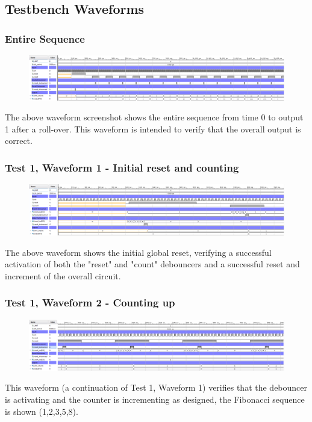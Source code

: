 \documentclass[11pt]{report}
\begin{document}
\subsection*{Testbench Waveforms}

\subsubsection*{Entire Sequence}
\begin{figure}[H]
    \includegraphics[width=\columnwidth]{Reports/Lab1/Waveforms/01_entire-sequence.png}
\end{figure}
The above waveform screenshot shows the entire sequence from time 0 to output 1 after a roll-over. This waveform is intended to verify that the overall output is correct.

\subsubsection*{Test 1, Waveform 1 - Initial reset and counting}
\begin{figure}[H]
    \includegraphics[width=\columnwidth]{Reports/Lab1/Waveforms/02_initial-reset-and-counting.png}
\end{figure}
The above waveform shows the initial global reset, verifying a successful activation of both the "reset" and "count" debouncers and a successful reset and increment of the overall circuit. 

\subsubsection*{Test 1, Waveform 2 - Counting up}
\begin{figure}[H]
    \includegraphics[width=\columnwidth]{Reports/Lab1/Waveforms/03_counting-up.png}
\end{figure}
This waveform (a continuation of Test 1, Waveform 1) verifies that the debouncer is activating and the counter is incrementing as designed, the Fibonacci sequence is shown (1,2,3,5,8).
\end{document}
